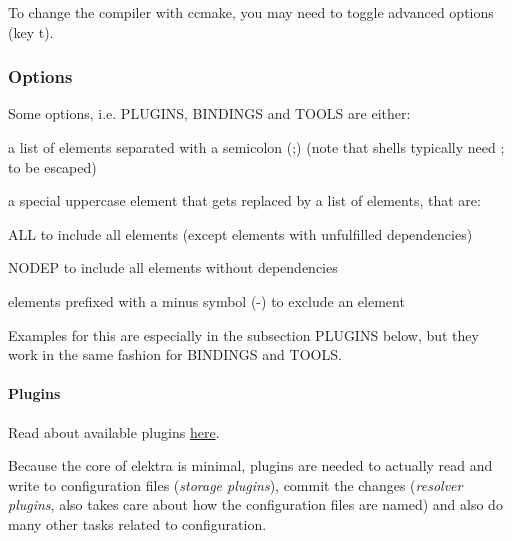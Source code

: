 To change the compiler with ccmake, you may need to toggle advanced options (key \textquotesingle{}t\textquotesingle{}).

\subsubsection*{Options}

Some options, i.\+e. {\ttfamily P\+L\+U\+G\+I\+NS}, {\ttfamily B\+I\+N\+D\+I\+N\+GS} and {\ttfamily T\+O\+O\+LS} are either\+:


\begin{DoxyItemize}
\item a list of elements separated with a semicolon ({\ttfamily ;}) (note that shells typically need {\ttfamily ;} to be escaped)
\item a special uppercase element that gets replaced by a list of elements, that are\+:
\begin{DoxyItemize}
\item {\ttfamily A\+LL} to include all elements (except elements with unfulfilled dependencies)
\item {\ttfamily N\+O\+D\+EP} to include all elements without dependencies
\end{DoxyItemize}
\item elements prefixed with a minus symbol ({\ttfamily -\/}) to exclude an element
\end{DoxyItemize}

Examples for this are especially in the subsection {\ttfamily P\+L\+U\+G\+I\+NS} below, but they work in the same fashion for {\ttfamily B\+I\+N\+D\+I\+N\+GS} and {\ttfamily T\+O\+O\+LS}.

\paragraph*{Plugins}

Read about available plugins \hyperlink{md_src_plugins_README_src_plugins_README_md}{here}.

Because the core of elektra is minimal, plugins are needed to actually read and write to configuration files ({\itshape storage plugins}), commit the changes ({\itshape resolver plugins}, also takes care about how the configuration files are named) and also do many other tasks related to configuration.

